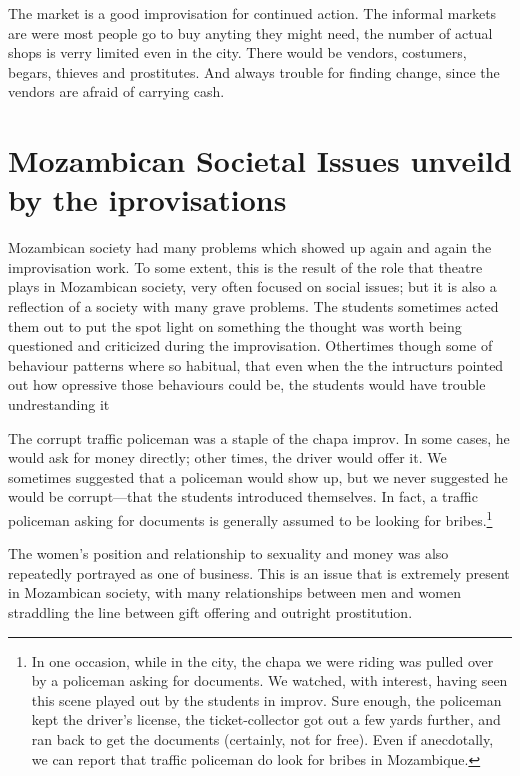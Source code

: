 \documentclass[article,twocolumn,twoside]{memoir}
\begin{document}
The market is a good improvisation for continued action. The informal markets
are were most people go to buy anyting they might need, the number of actual
shops is verry limited even in the city. There would be vendors, costumers,
begars, thieves and prostitutes. And always trouble for finding change, since
the vendors are afraid of carrying cash.

\section{Mozambican Societal Issues unveild by the iprovisations}

Mozambican society had many problems which showed up again and again the
improvisation work. To some extent, this is the result of the role that theatre
plays in Mozambican society, very often focused on social issues; but it is
also a reflection of a society with many grave problems. The students sometimes
acted them out to put the spot light on something the thought was worth being
questioned and criticized during the improvisation. Othertimes though some of
behaviour patterns where so habitual, that even when the the intructurs pointed
out how opressive those behaviours could be, the students would have trouble
undrestanding it

The corrupt traffic policeman was a staple of the chapa improv. In some cases,
he would ask for money directly; other times, the driver would offer it. We
sometimes suggested that a policeman would show up, but we never suggested he
would be corrupt---that the students introduced themselves. In fact, a traffic
policeman asking for documents is generally assumed to be looking for
bribes.\footnote{In one occasion, while in the city, the chapa we were riding
was pulled over by a policeman asking for documents. We watched, with interest,
having seen this scene played out by the students in improv. Sure enough, the
policeman kept the driver's license, the ticket-collector got out a few yards
further, and ran back to get the documents (certainly, not for free). Even if
anecdotally, we can report that traffic policeman do look for bribes in
Mozambique.}

The women's position and relationship to sexuality and money was also
repeatedly portrayed as one of business. This is an issue that is extremely
present in Mozambican society, with many relationships between men and women
straddling the line between gift offering and outright prostitution.
\end{document}
